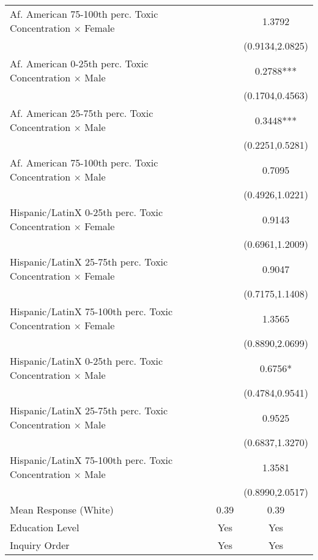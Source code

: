 \begin{table}[H]
\begin{threeparttable}
\begin{tabular}{@{\extracolsep{5pt}}lcc}
Af. American 75-100th perc. Toxic Concentration $\times$ Female&               &      1.3792   \\
                    &               &(0.9134,2.0825)   \\
Af. American 0-25th perc. Toxic Concentration $\times$ Male&               &      0.2788***\\
                    &               &(0.1704,0.4563)   \\
Af. American 25-75th perc. Toxic Concentration $\times$ Male&               &      0.3448***\\
                    &               &(0.2251,0.5281)   \\
Af. American 75-100th perc. Toxic Concentration $\times$ Male&               &      0.7095   \\
                    &               &(0.4926,1.0221)   \\
Hispanic/LatinX 0-25th perc. Toxic Concentration $\times$ Female&               &      0.9143   \\
                    &               &(0.6961,1.2009)   \\
Hispanic/LatinX 25-75th perc. Toxic Concentration $\times$ Female&               &      0.9047   \\
                    &               &(0.7175,1.1408)   \\
Hispanic/LatinX 75-100th perc. Toxic Concentration $\times$ Female&               &      1.3565   \\
                    &               &(0.8890,2.0699)   \\
Hispanic/LatinX 0-25th perc. Toxic Concentration $\times$ Male&               &      0.6756*  \\
                    &               &(0.4784,0.9541)   \\
Hispanic/LatinX 25-75th perc. Toxic Concentration $\times$ Male&               &      0.9525   \\
                    &               &(0.6837,1.3270)   \\
Hispanic/LatinX 75-100th perc. Toxic Concentration $\times$ Male&               &      1.3581   \\
                    &               &(0.8990,2.0517)   \\
\hline
 Mean Response (White)&        0.39   &        0.39   \\
\hline Education Level&         Yes   &         Yes   \\
Inquiry Order       &         Yes   &         Yes   \\

\end{tabular}
\end{threeparttable}
\end{table}
